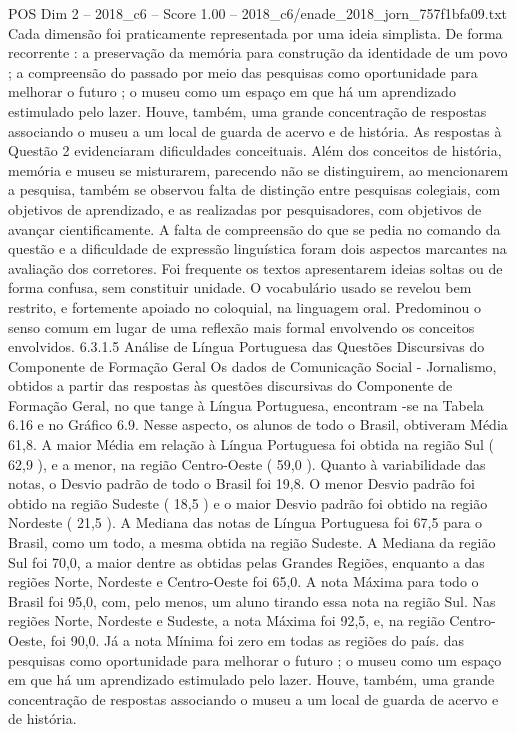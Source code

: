 \begin{textsample}{POS Dim 2 – 2018\_c6 – Score 1.00 – 2018\_c6/enade\_2018\_jorn\_757f1bfa09.txt}
Cada dimensão foi praticamente representada por uma ideia simplista.
De forma recorrente : a preservação da memória para construção da identidade de um povo ; a compreensão do passado por meio das pesquisas como oportunidade para melhorar o futuro ; o museu como um espaço em que há um aprendizado estimulado pelo lazer.
Houve, também, uma grande concentração de respostas associando o museu a um local de guarda de acervo e de história.
As respostas à Questão 2 evidenciaram dificuldades conceituais.
Além dos conceitos de história, memória e museu se misturarem, parecendo não se distinguirem, ao mencionarem a pesquisa, também se observou falta de distinção entre pesquisas colegiais, com objetivos de aprendizado, e as realizadas por pesquisadores, com objetivos de avançar cientificamente.
A falta de compreensão do que se pedia no comando da questão e a dificuldade de expressão linguística foram dois aspectos marcantes na avaliação dos corretores.
Foi frequente os textos apresentarem ideias soltas ou de forma confusa, sem constituir unidade.
O vocabulário usado se revelou bem restrito, e fortemente apoiado no coloquial, na linguagem oral.
Predominou o senso comum em lugar de uma reflexão mais formal envolvendo os conceitos envolvidos. 6.3.1.5 Análise de Língua Portuguesa das Questões Discursivas do Componente de Formação Geral Os dados de Comunicação Social - Jornalismo, obtidos a partir das respostas às questões discursivas do Componente de Formação Geral, no que tange à Língua Portuguesa, encontram -se na Tabela 6.16 e no Gráfico 6.9.
Nesse aspecto, os alunos de todo o Brasil, obtiveram Média 61,8.
A maior Média em relação à Língua Portuguesa foi obtida na região Sul ( 62,9 ), e a menor, na região Centro-Oeste ( 59,0 ).
Quanto à variabilidade das notas, o Desvio padrão de todo o Brasil foi 19,8.
O menor Desvio padrão foi obtido na região Sudeste ( 18,5 ) e o maior Desvio padrão foi obtido na região Nordeste ( 21,5 ).
A Mediana das notas de Língua Portuguesa foi 67,5 para o Brasil, como um todo, a mesma obtida na região Sudeste.
A Mediana da região Sul foi 70,0, a maior dentre as obtidas pelas Grandes Regiões, enquanto a das regiões Norte, Nordeste e Centro-Oeste foi 65,0.
A nota Máxima para todo o Brasil foi 95,0, com, pelo menos, um aluno tirando essa nota na região Sul.
Nas regiões Norte, Nordeste e Sudeste, a nota Máxima foi 92,5, e, na região Centro-Oeste, foi 90,0.
Já a nota Mínima foi zero em todas as regiões do país. das pesquisas como oportunidade para melhorar o futuro ; o museu como um espaço em que há um aprendizado estimulado pelo lazer.
Houve, também, uma grande concentração de respostas associando o museu a um local de guarda de acervo e de história.

\end{textsample}
